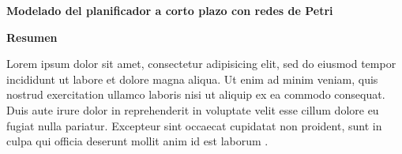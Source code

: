 \thispagestyle{plain}
\begin{center}
    \Large
    \textbf{Modelado del planificador a corto plazo con redes de Petri}

    \vspace{0.9cm}
    \textbf{Resumen}
\end{center}

Lorem ipsum dolor sit amet, consectetur adipisicing elit, sed do eiusmod tempor incididunt ut labore et dolore magna aliqua. Ut enim ad minim veniam, quis nostrud exercitation ullamco laboris nisi ut aliquip ex ea commodo consequat. Duis aute irure dolor in reprehenderit in voluptate velit esse cillum dolore eu fugiat nulla pariatur. Excepteur sint occaecat cupidatat non proident, sunt in culpa qui officia deserunt mollit anim id est laborum \citep{Feuerriegel2016}.
